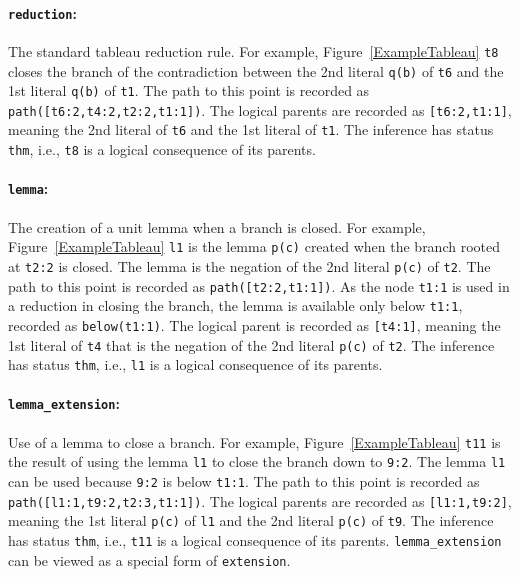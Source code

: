 \documentclass[runningheads]{llncs}
\newcommand{\smalltt}[1]{\small \texttt{#1}}
\newcommand{\mytilde}{\raisebox{0.4ex}{\texttildelow}}
\begin{document}
{\paragraph{{\tt reduction}:} The standard tableau reduction rule.
For example, Figure~\ref{ExampleTableau} {\smalltt{t8}} closes the branch of the contradiction 
between the 2nd literal {\smalltt{{\mytilde}q(b)}} of {\smalltt{t6}} and the 1st literal 
{\smalltt{q(b)}} of {\smalltt{t1}}.
The path to this point is recorded as {\smalltt{path([t6:2,t4:2,t2:2,t1:1])}}.
The logical parents are recorded as {\smalltt{[t6:2,t1:1]}}, meaning the 2nd literal of 
{\smalltt{t6}} and the 1st literal of {\smalltt{t1}}. 
The inference has status {\smalltt{thm}}, i.e., {\smalltt{t8}} is a logical consequence of its 
parents.

\paragraph{{\tt lemma}:} The creation of a unit lemma when a branch is closed.
For example, Figure~\ref{ExampleTableau} {\smalltt{l1}} is the lemma {\smalltt{p(c)}} created 
when the branch rooted at {\smalltt{t2:2}} is closed.
The lemma is the negation of the 2nd literal {\smalltt{{\mytilde}p(c)}} of {\smalltt{t2}}.
The path to this point is recorded as {\smalltt{path([t2:2,t1:1])}}.
As the node {\smalltt{t1:1}} is used in a reduction in closing the branch, the lemma is
available only below {\smalltt{t1:1}}, recorded as {\smalltt{below(t1:1)}}.
The logical parent is recorded as {\smalltt{[t4:1]}}, meaning the 1st literal of
{\smalltt{t4}} that is the negation of the 2nd literal {\smalltt{{\mytilde}p(c)}} of {\smalltt{t2}}.
The inference has status {\smalltt{thm}}, i.e., {\smalltt{l1}} is a logical consequence of its 
parents.

\paragraph{{\tt lemma\_extension}:} Use of a lemma to close a branch.
For example, Figure~\ref{ExampleTableau} {\smalltt{t11}} is the result of using the lemma 
{\smalltt{l1}} to close the branch down to {\smalltt{9:2}}.
The lemma {\smalltt{l1}} can be used because {\smalltt{9:2}} is below {\smalltt{t1:1}}.
The path to this point is recorded as {\smalltt{path([l1:1,t9:2,t2:3,t1:1])}}.
The logical parents are recorded as {\smalltt{[l1:1,t9:2]}}, meaning the 1st literal 
{\smalltt{p(c)}} of {\smalltt{l1}} and the 2nd literal {\smalltt{{\mytilde}p(c)}} of 
{\smalltt{t9}}.
The inference has status {\smalltt{thm}}, i.e., {\smalltt{t11}} is a logical consequence of its
parents.
{\tt lemma\_extension} can be viewed as a special form of {\tt extension}.

}
\end{document}
